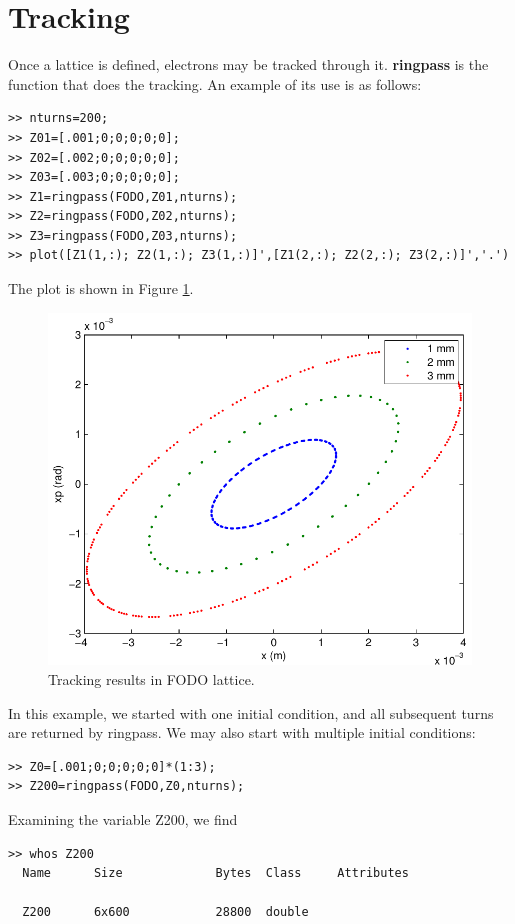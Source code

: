 \documentclass[acus]{article}
\newcommand{\mfun}[1]{{\bf{#1}}}
\begin{document}
\section{Tracking}
Once a lattice is defined, electrons may be tracked through it.  \mfun{ringpass} is the
function that does the tracking.  An example of its use is as follows:
\begin{verbatim}
>> nturns=200;
>> Z01=[.001;0;0;0;0;0];
>> Z02=[.002;0;0;0;0;0];
>> Z03=[.003;0;0;0;0;0];
>> Z1=ringpass(FODO,Z01,nturns);
>> Z2=ringpass(FODO,Z02,nturns);
>> Z3=ringpass(FODO,Z03,nturns);
>> plot([Z1(1,:); Z2(1,:); Z3(1,:)]',[Z1(2,:); Z2(2,:); Z3(2,:)]','.')
\end{verbatim}
The plot is shown in Figure \ref{trackPlot}.
\begin{figure}[htb]
\centering
\includegraphics[scale=0.5]{trackPlot.pdf}
\caption{Tracking results in FODO lattice.}
\label{trackPlot}
\end{figure}
In this example, we started with one initial condition, and all subsequent 
turns
are returned by ringpass.  We may also start with multiple initial conditions:
\begin{verbatim}
>> Z0=[.001;0;0;0;0;0]*(1:3);
>> Z200=ringpass(FODO,Z0,nturns);
\end{verbatim}
Examining the variable Z200, we find
\begin{verbatim}
>> whos Z200
  Name      Size             Bytes  Class     Attributes

  Z200      6x600            28800  double
\end{verbatim}
\end{document}
